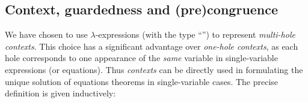 
\subsection{Context, guardedness and (pre)congruence}


We have chosen to use $\lambda$-expressions (with the type
``'')
to represent \emph{multi-hole contexts}.
%
This choice has a significant advantage over \emph{one-hole
contexts}, as each hole corresponds to one
appearance of the \emph{same} variable in single-variable
expressions (or equations). Thus \emph{contexts} can be directly used in
formulating the unique solution of equations theorems in
single-variable cases. The precise definition is given inductively:
